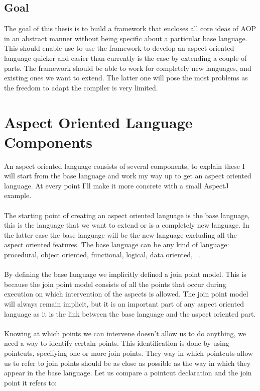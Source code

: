 \documentclass[a4paper]{report}
\begin{document}
\section{Goal}
The goal of this thesis is to build a framework that encloses all core ideas of AOP in an abstract manner without being specific about a particular base language. This should enable use to use the framework to develop an aspect oriented language quicker and easier than currently is the case by extending a couple of parts. The framework should be able to work for completely new languages, and existing ones we want to extend. The latter one will pose the most problems as the freedom to adapt the compiler is very limited.

\chapter{Aspect Oriented Language Components}
An aspect oriented language consists of several components, to explain these I will start from the base language and work my way up to get an aspect oriented language. At every point I'll make it more concrete with a small AspectJ example.\\
\\
The starting point of creating an aspect oriented language is the base language, this is the language that we want to extend or is a completely new language. In the latter case the base language will be the new language excluding all the aspect oriented features. The base language can be any kind of language: procedural, object oriented, functional, logical, data oriented, ...\\
\\
By defining the base language we implicitly defined a join point model. This is because the join point model consists of all the points that occur during execution on which intervention of the aspects is allowed. The join point model will always remain implicit, but it is an important part of any aspect oriented language as it is the link between the base language and the aspect oriented part.\\
\\
Knowing at which points we can intervene doesn't allow us to do anything, we need a way to identify certain points. This identification is done by using pointcuts, specifying one or more join points. They way in which pointcuts allow us to refer to join points should be as close as possible as the way in which they appear in the base language. Let us compare a pointcut declaration and the join point it refers to:
\end{document}
